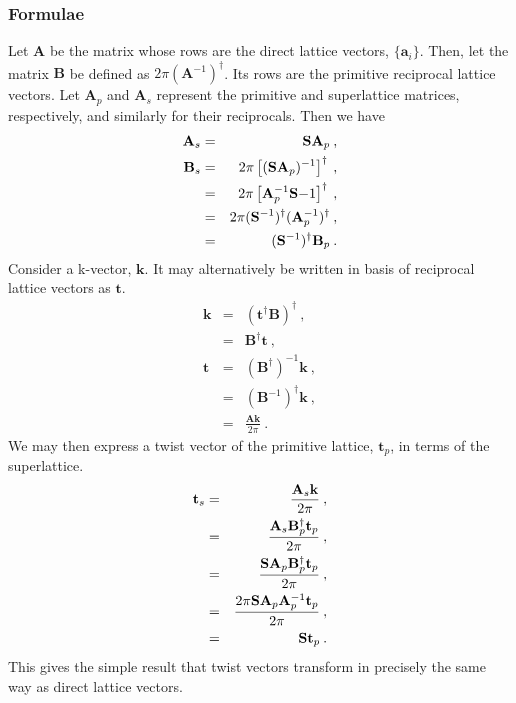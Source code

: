 \subsubsection{Formulae}
\newcommand{\Amat}{\mathbf{A}} 
\newcommand{\Bmat}{\mathbf{B}} 
\renewcommand{\vk}{\mathbf{k}}
\newcommand{\vt}{\mathbf{t}}

Let $\Amat$ be the matrix whose rows are the direct lattice vectors,
$\{\mathbf{a}_i\}$.  Then, let the matrix $\Bmat$ be defined as
$2\pi(\Amat^{-1})^\dagger$.  Its rows are the primitive reciprocal
lattice vectors.  Let $\Amat_p$ and $\Amat_s$ represent the primitive
and superlattice matrices, respectively, and similarly for their
reciprocals.  Then we have
\begin{eqnarray}
\Amat_s & = & \Smat \Amat_p\:, \\
\Bmat_s & = & 2\pi\left[(\Smat \Amat_p)^{-1}\right]^\dagger\:, \\
        & = & 2\pi\left[\Amat_p^{-1} \Smat{-1}\right]^\dagger\:, \\
        & = & 2\pi(\Smat^{-1})^\dagger (\Amat_p^{-1})^\dagger\:, \\
        & = & (\Smat^{-1})^\dagger \Bmat_p\:.
\end{eqnarray}  
Consider a k-vector, $\vk$.  It may alternatively be written in
basis of reciprocal lattice vectors as $\vt$.  
\begin{eqnarray}
\vk & = & (\vt^\dagger \Bmat)^\dagger\:, \\
    & = & \Bmat^\dagger \vt\:,           \\
\vt & = & (\Bmat^\dagger)^{-1} \vk\:,    \\
    & = & (\Bmat^{-1})^\dagger \vk\:,    \\
    & = & \frac{\Amat \vk}{2\pi}\:.
\end{eqnarray}
We may then express a twist vector of the primitive lattice, $\vt_p$, in terms
of the superlattice.
\begin{eqnarray}
\vt_s & = & \frac{\Amat_s \vk}{2\pi}\:,                           \\
      & = & \frac{\Amat_s \Bmat_p^\dagger \vt_p}{2\pi}\:,         \\
      & = & \frac{\Smat \Amat_p \Bmat_p^\dagger \vt_p}{2\pi}\:,   \\
      & = & \frac{2\pi \Smat \Amat_p \Amat_p^{-1} \vt_p}{2\pi}\:, \\
      & = & \Smat \vt_p\:.
\end{eqnarray}
This gives the simple result that twist vectors transform in precisely
the same way as direct lattice vectors.


